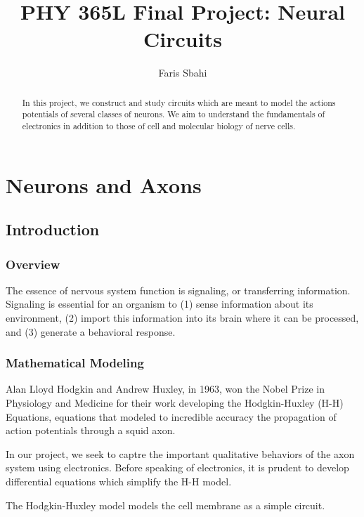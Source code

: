 \documentclass[12]{amsbook}
\title{PHY 365L Final Project: Neural Circuits}
\author{Faris Sbahi}
\newcommand\0{\mathbf{0}}
\newcommand\<{\langle}
\renewcommand\>{\rangle}
\begin{document}
\maketitle

\begin{abstract}
In this project, we construct and study circuits which are meant to model the actions potentials of several classes of neurons. We aim to understand the fundamentals of electronics in addition to those of cell and molecular biology of nerve cells.
\end{abstract}

\chapter{Neurons and Axons}

\section{Introduction}

\subsection{Overview}

The essence of nervous system function is signaling, or transferring information. Signaling is essential for an organism to (1) sense information about its environment, (2) import this information into its brain where it can be processed, and (3) generate a behavioral response.

\subsection{Mathematical Modeling}

Alan Lloyd Hodgkin and Andrew Huxley, in 1963, won the Nobel Prize in Physiology and Medicine for their work developing the Hodgkin-Huxley (H-H) Equations, equations that modeled to incredible accuracy the propagation of action potentials through a squid axon. 

In our project, we seek to captre the important qualitative behaviors of the axon system using electronics. Before speaking of electronics, it is prudent to develop differential equations which simplify the H-H model.

The Hodgkin-Huxley model models the cell membrane as a simple circuit. 
\end{document}
